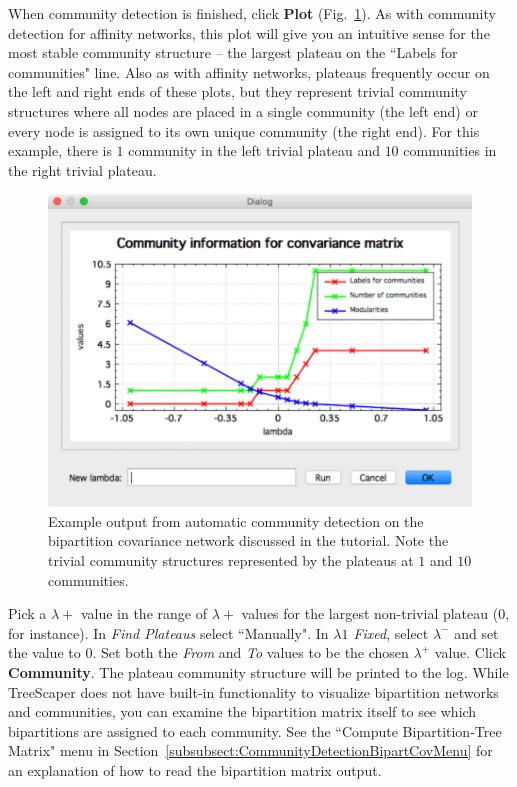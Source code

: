 \documentclass[11pt]{article}
\begin{document}
When community detection is finished, click {\bf Plot} (Fig.~\ref{fig5}). As with community
detection for affinity networks, this plot will give you an intuitive sense for the most stable
community structure -- the largest plateau on the ``Labels for communities" line. Also as with
affinity networks, plateaus frequently occur on the left and right ends of these plots, but they
represent trivial community structures where all nodes are placed in a single community (the
left end) or every node is assigned to its own unique community (the right end). For this
example, there is $1$ community in the left trivial plateau and $10$ communities in the right
trivial plateau.\\ 


\begin{figure}[thbp!]\centering
\includegraphics[scale=0.7]{imagesForManual/Figure5.pdf}
\caption{Example output from automatic community detection on the bipartition
covariance network discussed in the tutorial. Note the trivial community structures
represented by the plateaus at $1$ and $10$ communities.}\label{fig5}
\end{figure}


Pick a $\lambda+$ value in the range of $\lambda+$ values for the largest non-trivial plateau ($0$, for
instance). In {\it Find Plateaus} select ``Manually". In {\it $\lambda1$ Fixed}, select $\lambda^{-}$ and set the value to $0$. Set both the {\it From} and {\it To} values to be the chosen $\lambda^{+}$ value. Click {\bf Community}. The plateau community structure will be printed to the log. While TreeScaper does not have built-in functionality to visualize bipartition networks and communities, you can examine the bipartition matrix itself to see which bipartitions are assigned to each community. See the
``Compute Bipartition-Tree Matrix" menu in Section~\ref{subsubsect:CommunityDetectionBipartCovMenu} for an explanation of how to read
the bipartition matrix output. \\
\end{document}
